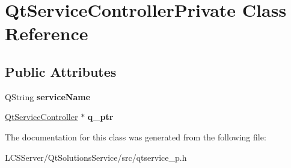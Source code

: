 \hypertarget{class_qt_service_controller_private}{}\section{Qt\+Service\+Controller\+Private Class Reference}
\label{class_qt_service_controller_private}
\subsection*{Public Attributes}
\begin{DoxyCompactItemize}
\item 
\mbox{\label{class_qt_service_controller_private_ab0c1b3e4f6189e131073b85d869a9823}} 
Q\+String {\bfseries service\+Name}
\item 
\mbox{\label{class_qt_service_controller_private_ac02268c462ca6440fddb3c319639da11}} 
\hyperlink{class_qt_service_controller}{Qt\+Service\+Controller} $\ast$ {\bfseries q\+\_\+ptr}
\end{DoxyCompactItemize}


The documentation for this class was generated from the following file\+:\begin{DoxyCompactItemize}
\item 
L\+C\+S\+Server/\+Qt\+Solutions\+Service/src/qtservice\+\_\+p.\+h\end{DoxyCompactItemize}
